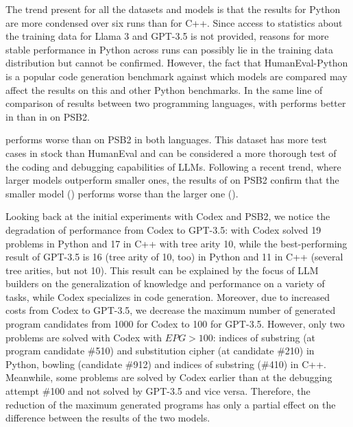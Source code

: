 The trend present for all the datasets and models is that the results for Python are more condensed over six runs than for C++. 
Since access to statistics about the training data for Llama 3 and GPT-3.5 is not provided, reasons for more stable performance in Python across runs can possibly lie in the training data distribution but cannot be confirmed. 
However, the fact that HumanEval-Python is a popular code generation benchmark against which models are compared may affect the results on this and other Python benchmarks.
In the same line of comparison of results between two programming languages, \method{} with \gpt{} performs better in \py{} than in \cpp{} on PSB2. 

% 
\llama{} performs worse than \gpt{} on PSB2 in both languages.
This dataset has more test cases in stock than HumanEval and can be considered a more thorough test of the coding and debugging capabilities of LLMs. 
Following a recent trend, where larger models outperform smaller ones, the results of \method{} on PSB2 confirm that the smaller model (\llama{}) performs worse than the larger one (\gpt{}).

Looking back at the initial experiments with Codex and PSB2, we notice the degradation of performance from Codex to GPT-3.5: \method{} with Codex solved 19 problems in Python and 17 in C++ with tree arity 10, while the best-performing result of \method{} GPT-3.5 is 16 (tree arity of 10, too) in Python and 11 in C++ (several tree arities, but not 10). 
This result can be explained by the focus of LLM builders on the generalization of knowledge and performance on a variety of tasks, while Codex specializes in code generation.
Moreover, due to increased costs from Codex to GPT-3.5, we decrease the maximum number of generated program candidates from 1000 for Codex to 100 for GPT-3.5. 
However, only two problems are solved with Codex with $EPG > 100$: indices of substring (at program candidate \#510) and substitution cipher (at candidate \#210) in Python, bowling (candidate \#912) and indices of substring (\#410) in C++. 
Meanwhile, some problems are solved by Codex earlier than at the debugging attempt \#100 and not solved by GPT-3.5 and vice versa. 
Therefore, the reduction of the maximum generated programs has only a partial effect on the difference between the results of the two models. 


